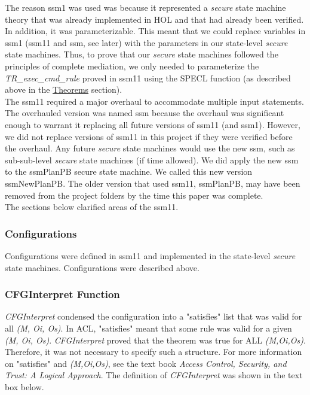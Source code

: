  The reason ssm1 was used was because it represented a \textit{secure} state machine
  theory that was already implemented in HOL and that had already been verified.  In addition,
  it was parameterizable.  This meant that we could replace variables in ssm1 (ssm11 and ssm,
  see later) with the parameters in our state-level \textit{secure} state machines.  Thus, to
  prove that our \textit{secure} state machines followed the principles of complete mediation,
  we only needed to parameterize the \textit{TR_exec_cmd_rule} proved in ssm11 using the SPECL
  function (as described above in the \underline{Theorems} section).\\
  
 The ssm11 required a major overhaul to accommodate multiple input statements.  The
  overhauled version was named ssm because the overhaul was significant enough to warrant it
  replacing all future versions of ssm11 (and ssm1).  However, we did not replace versions of
  ssm11 in this project if they were verified before the overhaul.  Any future \textit{secure}
  state machines would use the new ssm, such as sub-sub-level \textit{secure} state machines
  (if time allowed).  We did apply the new ssm to the ssmPlanPB secure state machine.  We
  called this new version ssmNewPlanPB.  The older version that used ssm11, ssmPlanPB, may
  have been removed from the project folders by the time this paper was complete.\\
  
 The sections below clarified areas of the ssm11.\\

  
\subsubsection{Configurations}
\label{sec:configurations-1}

  Configurations were defined in ssm11 and implemented in the state-level \textit{secure} state
  machines.  Configurations were described above.

  
\subsubsection{CFGInterpret Function}
\label{sec:cfgint-funct}

  \textit{CFGInterpret} condensed the configuration into a "satisfies" list that was valid for all
  \textit{(M, Oi, Os)}.  In ACL, "satisfies" meant that some rule was valid for a given
  \textit{(M, Oi, Os)}.  \textit{CFGInterpret} proved that the theorem was true for ALL
  \textit{(M,Oi,Os)}.  Therefore, it was not necessary to specify such a structure.  For
  more information on "satisfies" and \textit{(M,Oi,Os)}, see the text book
  \textit{Access Control, Security, and Trust: A Logical Approach}.  The definition of
  \textit{CFGInterpret} was shown in the text box below.\\
  
